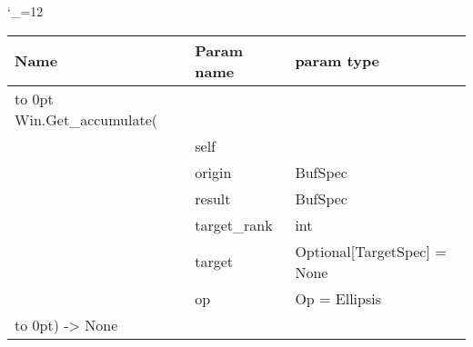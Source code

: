 \begingroup \catcode`\_=12 \tt
\begin{tabular}{lll}
\toprule
\textrm{Name}&\textrm{Param name}&\textrm{param type}\\
\midrule
\hbox to 0pt {Win.Get_accumulate(\hss}\\
& self\\
& origin & BufSpec\\
& result & BufSpec\\
& target_rank & int\\
& target & Optional[TargetSpec] = None\\
& op & Op = Ellipsis\\
\hbox to 0pt{) -> None\hss}\\
\bottomrule
\end{tabular}
\endgroup
